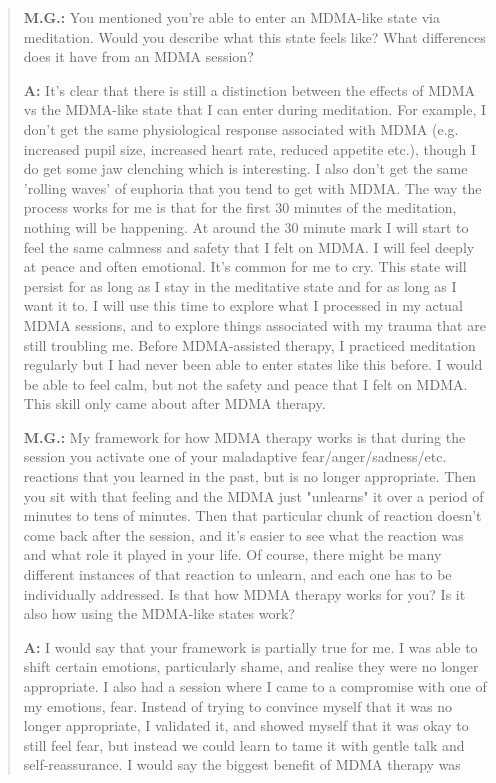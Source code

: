 \documentclass[12pt,letterpaper]{book}
\begin{document}
\begin{quotation}
    \textbf{M.G.:} You mentioned you’re able to enter an MDMA-like state via meditation. Would you describe what this state feels like? What differences does it have from an MDMA session?

    \textbf{A:} It's clear that there is still a distinction between the effects of MDMA vs the MDMA-like state that I can enter during meditation. For example, I don't get the same physiological response associated with MDMA (e.g. increased pupil size, increased heart rate, reduced appetite etc.), though I do get some jaw clenching which is interesting. I also don't get the same 'rolling waves' of euphoria that you tend to get with MDMA. The way the process works for me is that for the first 30 minutes of the meditation, nothing will be happening. At around the 30 minute mark I will start to feel the same calmness and safety that I felt on MDMA. I will feel deeply at peace and often emotional. It's common for me to cry. This state will persist for as long as I stay in the meditative state and for as long as I want it to. I will use this time to explore what I processed in my actual MDMA sessions, and to explore things associated with my trauma that are still troubling me. Before MDMA-assisted therapy, I practiced meditation regularly but I had never been able to enter states like this before. I would be able to feel calm, but not the safety and peace that I felt on MDMA. This skill only came about after MDMA therapy.

    \vspace{\baselineskip}

    \textbf{M.G.:} My framework for how MDMA therapy works is that during the session you activate one of your maladaptive fear/anger/sadness/etc. reactions that you learned in the past, but is no longer appropriate. Then you sit with that feeling and the MDMA just "unlearns" it over a period of minutes to tens of minutes. Then that particular chunk of reaction doesn’t come back after the session, and it’s easier to see what the reaction was and what role it played in your life. Of course, there might be many different instances of that reaction to unlearn, and each one has to be individually addressed. Is that how MDMA therapy works for you? Is it also how using the MDMA-like states work?

    \textbf{A:} I would say that your framework is partially true for me. I was able to shift certain emotions, particularly shame, and realise they were no longer appropriate. I also had a session where I came to a compromise with one of my emotions, fear. Instead of trying to convince myself that it was no longer appropriate, I validated it, and showed myself that it was okay to still feel fear, but instead we could learn to tame it with gentle talk and self-reassurance. I would say the biggest benefit of MDMA therapy was 


\end{quotation}
\end{document}
